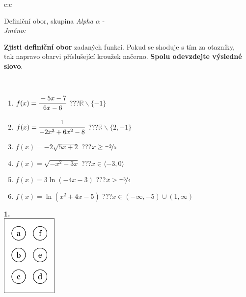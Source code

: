 \documentclass[10pt]{report}
\begin{document}
\thispagestyle{empty}
\begin{tabular}{c:c}
\begin{minipage}[c][104.5mm][t]{0.5\linewidth}
\begin{center}
\vspace{7mm}
{\huge Definiční obor, skupina \textit{Alpha $\alpha$} -}\\[5mm]
\textit{Jméno:}\phantom{xxxxxxxxxxxxxxxxxxxxxxxxxxxxxxxxxxxxxxxxxxxxxxxxxxxxxxxxxxxxxxxxx}\\[5mm]
\begin{minipage}{0.95\linewidth}
\begin{center}
\textbf{Zjisti definiční obor} zadaných funkcí. Pokud se shoduje s tím za otazníky,\\tak napravo obarvi příslušející kroužek načerno. \textbf{Spolu odevzdejte výsledné slovo}.
\end{center}
\end{minipage}
\\[1mm]
\begin{minipage}{0.79\linewidth}
\begin{center}
\begin{varwidth}{\linewidth}
\begin{enumerate}
\normalsizerrr
\item $f(x)=\cfrac{-5x-7}{6x-6}$\quad \dotfill\; ???\;\dotfill \quad $\mathbb{R}\smallsetminus\{-1\}$
\item $f(x)=\cfrac{1}{-2x^3+6x^2-8}$\quad \dotfill\; ???\;\dotfill \quad $\mathbb{R}\smallsetminus\{2,-1\}$
\item $f(x)=-2\sqrt{5x+2}$\quad \dotfill\; ???\;\dotfill \quad $x\geq\nicefrac{-2}{5}$
\item $f(x)=\sqrt{-x^2-3x}$\quad \dotfill\; ???\;\dotfill \quad $x\in\langle-3 , 0\rangle$
\item $f(x)=3\ln{(-4x-3)}$\quad \dotfill\; ???\;\dotfill \quad $x>\nicefrac{-3}{4}$
\item $f(x)=\ln{(x^2+4x-5)}$\quad \dotfill\; ???\;\dotfill \quad $x\in(-\infty , -5)\cup(1 , \infty)$
\end{enumerate}
\end{varwidth}
\end{center}
\end{minipage}
\begin{minipage}{0.20\linewidth}
\begin{center}
{\Huge\bfseries 1.} \\[2mm]
\includegraphics[height=40mm]{../images/braille.png}

\end{center}
\end{minipage}
\end{center}
\end{minipage}
\end{tabular}
\end{document}

